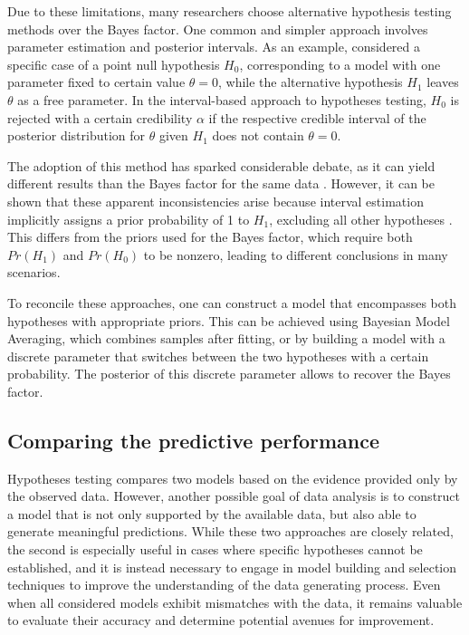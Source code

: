 Due to these limitations, many researchers choose alternative hypothesis testing methods over the Bayes factor. One
common and simpler approach involves parameter estimation and posterior intervals. As an example, considered a specific
case of a point
null hypothesis $H_0$, corresponding to a model with one parameter fixed to certain value $\theta = 0$, while the
alternative hypothesis $H_1$ leaves $\theta$ as a free parameter. In the interval-based approach to hypotheses testing,
$H_0$ is rejected with a certain credibility $\alpha$ if the respective credible interval of the posterior distribution
for $\theta$ given $H_1$ does not contain $\theta = 0$.


The adoption of this method has sparked considerable debate, as it can yield different results than the Bayes factor for
the same data \cite{wagenmakers2020principle}. However, it can be shown that these apparent inconsistencies arise because
interval estimation implicitly assigns a prior probability of 1 to $H_1$, excluding all other hypotheses  \cite{campbell2023twofaces}. This differs from the priors used for the Bayes factor, which require both $Pr(H_1)$ and $Pr(H_0)$ to be nonzero, leading to different conclusions in many scenarios.

To reconcile these approaches, one can construct a model that encompasses both hypotheses with appropriate priors. This can be achieved using Bayesian Model Averaging, which combines samples after fitting, or by building a model with a discrete parameter that switches between the two hypotheses with a certain probability. The posterior of this discrete parameter allows to recover the Bayes factor.


\subsection{Comparing the predictive performance}
Hypotheses testing compares two models based on the evidence provided only by the observed data.
However, another possible goal of data analysis is to construct a model that is not only supported by the
available data, but also able to generate meaningful predictions. While these two approaches are closely related, the
second is especially useful in cases where specific hypotheses
cannot be established, and it is instead necessary to engage in model building and selection techniques to improve the understanding of the data generating process.
Even when all considered models exhibit mismatches with the data, it remains
valuable to evaluate their accuracy and determine potential avenues for improvement. 

